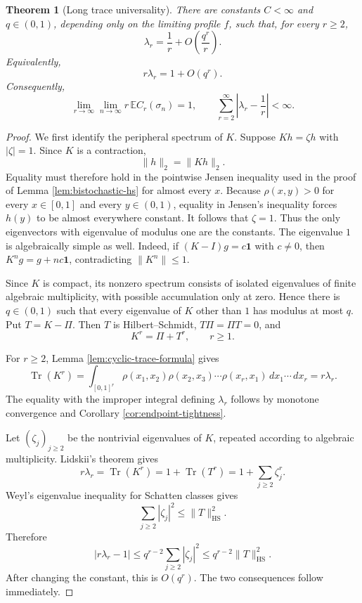\documentclass[11pt]{article}
\newtheorem{theorem}{Theorem}[section]
\theoremstyle{remark}
\newcommand{\Ee}{\mathbb E}
\newcommand{\one}{\mathbf 1}
\newcommand{\dd}{\,d}
\begin{document}
\begin{theorem}[Long trace universality]\label{thm:long-trace}
There are constants $C<\infty$ and $q\in(0,1)$, depending only on the limiting
profile $f$, such that, for every $r\ge2$,
\[
        \boxed{\displaystyle
        \lambda_r=\frac1r+O\!\left(\frac{q^r}{r}\right).}
\]
Equivalently,
\[
        r\lambda_r=1+O(q^r).
\]
Consequently,
\[
        \lim_{r\to\infty}\lim_{n\to\infty}
        r\,\Ee C_r(\sigma_n)=1,
        \qquad
        \sum_{r=2}^\infty\left|\lambda_r-\frac1r\right|<\infty.
\]
\end{theorem}

\begin{proof}
We first identify the peripheral spectrum of $K$.  Suppose $Kh=\zeta h$ with
$|\zeta|=1$.  Since $K$ is a contraction,
\[
        \|h\|_2=\|Kh\|_2.
\]
Equality must therefore hold in the pointwise Jensen inequality used in the
proof of Lemma \ref{lem:bistochastic-hs} for almost every $x$.  Because
$\rho(x,y)>0$ for every $x\in[0,1]$ and every $y\in(0,1)$, equality in Jensen's
inequality forces $h(y)$ to be almost everywhere constant.  It follows that
$\zeta=1$.  Thus the only eigenvectors with eigenvalue of modulus one are the
constants.  The eigenvalue $1$ is algebraically simple as well.  Indeed, if
$(K-I)g=c\one$ with $c\ne0$, then $K^ng=g+nc\one$, contradicting
$\|K^n\|\le1$.

Since $K$ is compact, its nonzero spectrum consists of isolated eigenvalues of
finite algebraic multiplicity, with possible accumulation only at zero.  Hence
there is $q\in(0,1)$ such that every eigenvalue of $K$ other than $1$ has
modulus at most $q$.  Put $T=K-\Pi$.  Then $T$ is Hilbert--Schmidt,
$T\Pi=\Pi T=0$, and
\[
        K^r=\Pi+T^r,
        \qquad r\ge1.
\]

For $r\ge2$, Lemma \ref{lem:cyclic-trace-formula} gives
\[
        \operatorname{Tr}(K^r)
        =\int_{[0,1]^r}
        \rho(x_1,x_2)\rho(x_2,x_3)\cdots\rho(x_r,x_1)
        \dd x_1\cdots\dd x_r
        =r\lambda_r.
\]
The equality with the improper integral defining $\lambda_r$ follows by
monotone convergence and Corollary \ref{cor:endpoint-tightness}.

Let $(\zeta_j)_{j\ge2}$ be the nontrivial eigenvalues of $K$, repeated according
to algebraic multiplicity.  Lidskii's theorem \cite[Theorem~3.7]{Simon2005} gives
\[
        r\lambda_r=\operatorname{Tr}(K^r)
        =1+\operatorname{Tr}(T^r)
        =1+\sum_{j\ge2}\zeta_j^r.
\]
Weyl's eigenvalue inequality for Schatten classes
\cite[Theorem~2.3]{Simon2005} gives
\[
        \sum_{j\ge2}|\zeta_j|^2\le\|T\|_{\mathrm{HS}}^2.
\]
Therefore
\[
        \left|r\lambda_r-1\right|
        \le q^{r-2}\sum_{j\ge2}|\zeta_j|^2
        \le q^{r-2}\|T\|_{\mathrm{HS}}^2.
\]
After changing the constant, this is $O(q^r)$.  The two consequences follow
immediately.
\end{proof}
\end{document}
